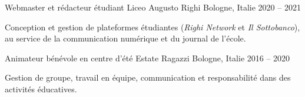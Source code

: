 \documentclass[11pt, a4paper]{../awesome-cv}
\begin{document}
\begin{cventries}
  \cventry
    {Webmaster et rédacteur étudiant}
    {Liceo Augusto Righi}
    {Bologne, Italie}
    {2020 -- 2021}
    {
      \begin{cvitems}
        \item {Conception et gestion de plateformes étudiantes (\textit{Righi Network} et \textit{Il Sottobanco}), au service de la communication numérique et du journal de l'école.}
      \end{cvitems}
    }

  \cventry
    {Animateur bénévole en centre d'été}
    {Estate Ragazzi}
    {Bologne, Italie}
    {2016 -- 2020}
    {
      \begin{cvitems}
        \item {Gestion de groupe, travail en équipe, communication et responsabilité dans des activités éducatives.}
      \end{cvitems}
    }
\end{cventries}
\end{document}
